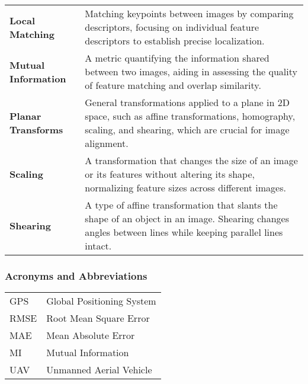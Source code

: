\begin{tabularx}{\textwidth}{@{}p{2.5cm}L}
    \textbf{Local Matching} & 
    Matching keypoints between images by comparing descriptors, focusing on individual feature descriptors to establish precise localization. \\

    \textbf{Mutual Information} & 
    A metric quantifying the information shared between two images, aiding in assessing the quality of feature matching and overlap similarity. \\

    \textbf{Planar Transforms} & 
    General transformations applied to a plane in 2D space, such as affine transformations, homography, scaling, and shearing, which are crucial for image alignment. \\

    \textbf{Scaling} & 
    A transformation that changes the size of an image or its features without altering its shape, normalizing feature sizes across different images. \\

    \textbf{Shearing} & 
    A type of affine transformation that slants the shape of an object in an image. Shearing changes angles between lines while keeping parallel lines intact. \\

\end{tabularx}
\endgroup

\newpage
\subsubsection*{Acronyms and Abbreviations}

\begingroup
\renewcommand{\arraystretch}{1.2}
\begin{tabular}{@{}p{2.5cm} l}
    GPS     & Global Positioning System \\
    RMSE    & Root Mean Square Error \\
    MAE     & Mean Absolute Error \\
    MI      & Mutual Information \\
    UAV     & Unmanned Aerial Vehicle \\
\end{tabular}
\endgroup
